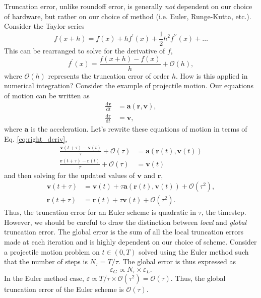 Truncation error, unlike roundoff error, is generally \textit{not} dependent on our choice of hardware, but rather on our choice of method (i.e. Euler, Runge-Kutta, etc.). Consider the Taylor series
\begin{equation}
	f(x+h) = f(x) + hf^{\prime}(x) + \frac{1}{2}h^2f^{\prime\prime}(x) + \ldots
\end{equation}
This can be rearranged to solve for the derivative of $f$,
\begin{equation}
	f^{\prime}(x)=\frac{f(x+h)-f(x)}{h} + \mathcal{O}(h),
	\label{eq:right_deriv}
\end{equation}
where $\mathcal{O}(h)$ represents the truncation error of order $h$. How is this applied in numerical integration? Consider the example of projectile motion. Our equations of motion can be written as
\begin{align}
	\frac{\mathrm{d}\mathbf{v}}{\mathrm{d}t} &= \mathbf{a}(\mathbf{r},\mathbf{v}), \\[0.5em]
	\frac{\mathrm{d}\mathbf{r}}{\mathrm{d}t} &= \mathbf{v},
\end{align}
where $\mathbf{a}$ is the acceleration. Let's rewrite these equations of motion in terms of Eq. \ref{eq:right_deriv},
\begin{align}
	\frac{\mathbf{v}(t+\tau) - \mathbf{v}(t)}{\tau} + \mathcal{O}(\tau) &= \mathbf{a}(\mathbf{r}(t),\mathbf{v}(t)) \\[0.5em]
	\frac{\mathbf{r}(t+\tau) - \mathbf{r}(t)}{\tau} + \mathcal{O}(\tau) &= \mathbf{v}(t)
\end{align}
and then solving for the updated values of $\mathbf{v}$ and $\mathbf{r}$,
\begin{align}
	\mathbf{v}(t+\tau) &= \mathbf{v}(t) + \tau\mathbf{a}(\mathbf{r}(t),\mathbf{v}(t)) + \mathcal{O}(\tau^2), \\[0.5em]
	\mathbf{r}(t+\tau) &= \mathbf{r}(t) + \tau\mathbf{v}(t) + \mathcal{O}(\tau^2).
\end{align}
Thus, the truncation error for an Euler scheme is quadratic in $\tau$, the timestep. However, we should be careful to draw the distinction between \textit{local} and \textit{global} truncation error. The global error is the sum of all the local truncation errors made at each iteration and is highly dependent on our choice of scheme. Consider a projectile motion problem on $t\in(0,T)$ solved using the Euler method such that the number of steps is $N_{\tau}=T/\tau$. The global error is thus expressed as 
\begin{equation}
	\varepsilon_{G}\propto N_{\tau}\times \varepsilon_L.
\end{equation}
In the Euler method case, $\varepsilon\propto T/\tau\times\mathcal{O}(\tau^2)=\mathcal{O}(\tau)$. Thus, the global truncation error of the Euler scheme is $\mathcal{O}(\tau)$.

